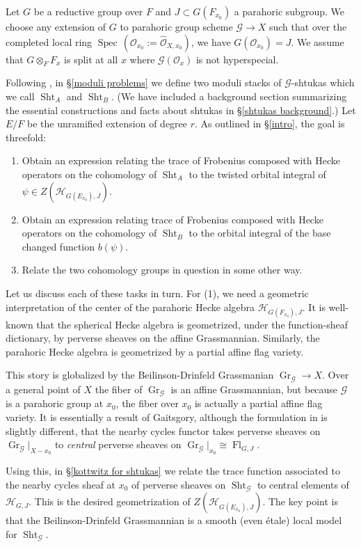 \documentclass[reqno]{amsart}
\numberwithin{equation}{section}
\newcommand{\wh}[1]{\widehat{#1}}
\newcommand{\Cal}[1]{\mathcal{#1}}
\DeclareMathOperator{\Spec}{Spec\,}
\DeclareMathOperator{\Gr}{Gr}
\DeclareMathOperator{\Sht}{Sht}
\DeclareMathOperator{\Fl}{Fl}
\theoremstyle{remark}
\numberwithin{equation}{section}
\begin{document}
Let $G$ be a reductive group over $F$ and  $J \subset G(F_{x_0})$ a parahoric subgroup. We choose any extension of $G$ to parahoric group scheme $\Cal{G} \rightarrow X$ such that over the completed local ring $\Spec (\Cal{O}_{x_0} := \wh{\Cal{O}}_{X,x_0}) $, we have $G(\Cal{O}_{x_0}) = J$. We assume that $G \otimes_F F_x$ is split at all $x$ where $\Cal{G}(\Cal{O}_x)$ is not hyperspecial. 

Following \cite{Ngo06}, in \S \ref{moduli  problems} we define two moduli stacks of $\Cal{G}$-shtukas which we call $\Sht_A$ and $\Sht_B$. (We have included a background section summarizing the essential constructions and facts about shtukas in \S \ref{shtukas background}.) Let $E/F$ be the unramified extension of degree $r$. As outlined in \S \ref{intro}, the goal is threefold:
\begin{enumerate}
\item Obtain an expression relating the trace of Frobenius composed with Hecke operators on the cohomology of $\Sht_A$ to the twisted orbital integral of $\psi \in Z(\Cal{H}_{G(E_{x_0}),J})$. 
\item Obtain an expression relating trace of Frobenius composed with Hecke operators on the cohomology of $\Sht_B$ to the orbital integral of the base changed function $b(\psi)$.
\item Relate the two cohomology groups in question in some other way. 
\end{enumerate} 
Let us discuss each of these tasks in turn. For (1), we need a geometric interpretation of the center of the parahoric Hecke algebra $\Cal{H}_{G(F_{x_0}), J}$. It is well-known that the spherical Hecke algebra is geometrized, under the function-sheaf dictionary, by perverse sheaves on the affine Grassmannian. Similarly, the parahoric Hecke algebra is geometrized by a partial affine flag variety.

This story is globalized by the Beilinson-Drinfeld Grassmanian $\Gr_{\Cal{G}} \rightarrow X$. Over a general point of $X$ the fiber of $\Gr_{\Cal{G}}$ is an affine Grassmannian, but because $\Cal{G}$ is a parahoric group at $x_0$, the fiber over $x_0$ is actually a partial affine flag variety.  It is essentially a result of Gaitsgory, although the formulation in \cite{Gaits01} is slightly different, that the nearby cycles functor takes perverse sheaves on $\Gr_{\Cal{G}}|_{X-x_0}$ to \emph{central} perverse sheaves on $\Gr_{\Cal{G}}|_{x_0} \cong \Fl_{G, J}$. 

Using this, in \S \ref{kottwitz for shtukas} we relate the trace function associated to the nearby cycles sheaf at $x_0$ of perverse sheaves on $\Sht_{\Cal{G}}$ to central elements of $\Cal{H}_{G,J}$. This is the desired geometrization of $Z(\Cal{H}_{G(E_{x_0}),J})$. The key point is that the Beilinson-Drinfeld Grassmannian is a smooth (even \'{e}tale) local model for $\Sht_{\Cal{G}}$.
\end{document}
